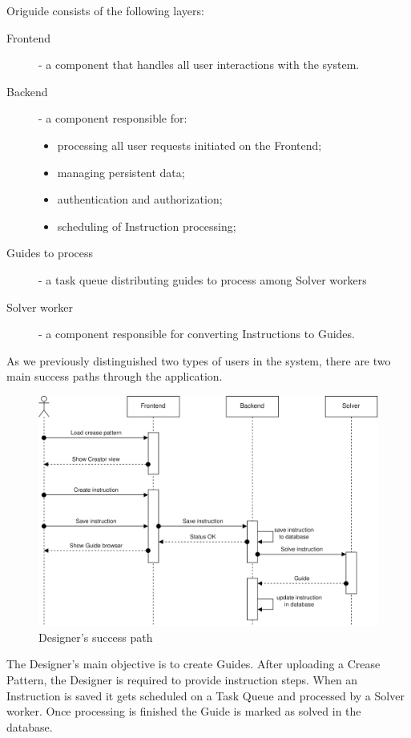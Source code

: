 Origuide consists of the following layers:
\begin{description}
	\item[Frontend] - a component that handles all user interactions with the system. 
	\item[Backend] - a component responsible for: \begin{itemize}
		\item processing all user requests initiated on the Frontend;
		\item managing persistent data;
		\item authentication and authorization;
		\item scheduling of Instruction processing;
	\end{itemize}
	\item[Guides to process] - a task queue distributing guides to process among Solver workers
	\item[Solver worker] - a component responsible for converting Instructions to Guides.
\end{description}

As we previously distinguished two types of users in the system, there are two main success paths through the application.

\begin{figure}[H]
	\caption{Designer's success path}
  \centering
    \includegraphics[width=1\textwidth]{assets/3-designer-flow.png}
\end{figure}

The Designer's main objective is to create Guides. After uploading a Crease Pattern, the Designer is required to provide instruction steps. When an Instruction is saved it gets scheduled on a Task Queue and processed by a Solver worker. Once processing is finished the Guide is marked as solved in the database.

